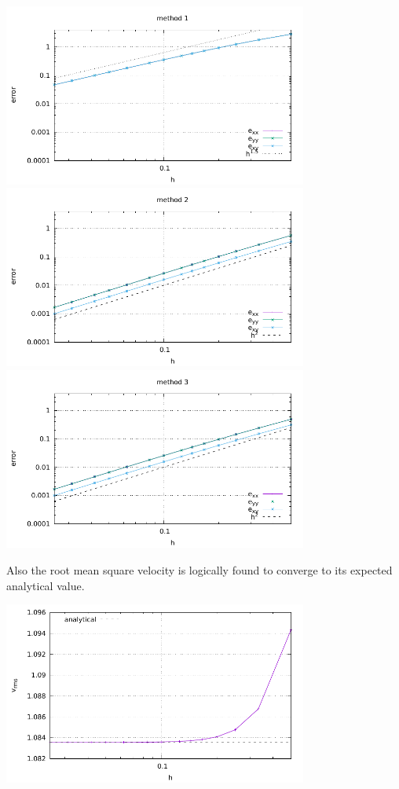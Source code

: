 \begin{center}
\includegraphics[width=10cm]{python_codes/fieldstone_21/results/errors_sr1.pdf}\\
\includegraphics[width=10cm]{python_codes/fieldstone_21/results/errors_sr2.pdf}\\
\includegraphics[width=10cm]{python_codes/fieldstone_21/results/errors_sr3.pdf}
\end{center}

Also the root mean square velocity is logically found to converge to its 
expected analytical value.

\begin{center}
\includegraphics[width=10cm]{python_codes/fieldstone_21/results/vrms.pdf}
\end{center}

